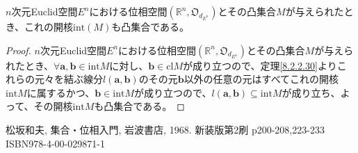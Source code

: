 \documentclass[dvipdfmx]{jsarticle}
\begin{document}
\begin{thm}\label{8.2.2.31}
$n$次元Euclid空間$E^{n}$における位相空間$\left( \mathbb{R}^{n},\mathfrak{O}_{d_{E^{n}}} \right)$とその凸集合$M$が与えられたとき、これの開核${\mathrm{int}}(M)$も凸集合である。
\end{thm}
\begin{proof}
$n$次元Euclid空間$E^{n}$における位相空間$\left( \mathbb{R}^{n},\mathfrak{O}_{d_{E^{n}}} \right)$とその凸集合$M$が与えられたとき、$\forall\mathbf{a},\mathbf{b} \in {\mathrm{int}}M$に対し、$\mathbf{b} \in {\mathrm{cl}}M$が成り立つので、定理\ref{8.2.2.30}よりこれらの元々を結ぶ線分$l\left( \mathbf{a},\mathbf{b} \right)$のその元$\mathbf{b}$以外の任意の元はすべてこれの開核${\mathrm{int}}M$に属するかつ、$\mathbf{b} \in {\mathrm{int}}M$が成り立つので、$l\left( \mathbf{a},\mathbf{b} \right) \subseteq {\mathrm{int}}M$が成り立ち、よって、その開核${\mathrm{int}}M$も凸集合である。
\end{proof}
\begin{thebibliography}{50}
  松坂和夫, 集合・位相入門, 岩波書店, 1968. 新装版第2刷 p200-208,223-233 ISBN978-4-00-029871-1
\end{thebibliography}
\end{document}
